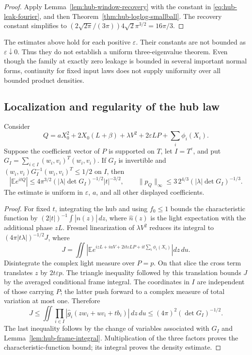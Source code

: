 \begin{proof}
Apply Lemma~\ref{lem:hub-window-recovery} with the constant in
\eqref{eq:hub-leak-fourier}, and then
Theorem~\ref{thm:hub-loglog-smallball}.
The recovery constant simplifies to
$(2\sqrt{2\pi}/(3\pi))4\sqrt2\pi^{3/2}=16\pi/3$.
\end{proof}

\begin{remark}\label{rem:hub-endpoint-open}
The estimates above hold for each positive $\varepsilon$.
Their constants are not bounded as $\varepsilon\downarrow0$.
Thus they do not establish a uniform three-eigenvalue theorem.
Even though the family at exactly zero leakage is bounded in several
important normal forms, continuity for fixed input laws does not supply
uniformity over all bounded product densities.
\end{remark}

\subsection{Localization and regularity of the hub law}

\begin{proposition}\label{prop:hub-localized}
Consider
\[
 Q=aX_0^2+2X_0(L+\beta)+\lambda V^2
                          +2\varepsilon LP+\sum_i\phi_i(X_i).
\]
Suppose the coefficient vector of $P$ is supported on $T$, let
$I=T^c$, and put
$G_I=\sum_{i\in I}(w_i,v_i)^T(w_i,v_i)$.
If $G_I$ is invertible and
$(w_i,v_i)G_I^{-1}(w_i,v_i)^T\le1/2$ on $I$, then
\[
 |\mathbb E e^{itQ}|\le
 4\pi^{3/2}(|\lambda|\det G_I)^{-1/2}|t|^{-3/2},
 \qquad
 \|p_Q\|_\infty\le
 3\,2^{4/3}(|\lambda|\det G_I)^{-1/3}.
\]
The estimate is uniform in $\varepsilon$, $a$, and all other displayed
coefficients.
\end{proposition}

\begin{proof}
For fixed $t$, integrating the hub and using $f_0\le1$ bounds the
characteristic function by $(2|t|)^{-1}\int|\widehat n(z)|\,dz$,
where $\widehat n(z)$ is the light expectation with the additional
phase $zL$.  Fresnel linearization of $\lambda V^2$ reduces its
integral to $(4\pi|t\lambda|)^{-1/2}J$, where
\[
 J=\iint\left|\mathbb E e^{izL+iuV+2it\varepsilon LP
                                     +it\sum_i\phi_i(X_i)}\right|dz\,du.
\]
Disintegrate the complex light measure over $P=p$.  On that slice the
cross term translates $z$ by $2t\varepsilon p$.  The triangle
inequality followed by this translation bounds $J$ by the averaged
conditional frame integral.  The coordinates in $I$ are independent
of those carrying $P$; the latter push forward to a complex measure of
total variation at most one.  Therefore
\[
 J\le\iint\prod_{i\in I}
        |\widehat g_i(zw_i+uv_i+tb_i)|\,dz\,du
 \le(4\pi)^2(\det G_I)^{-1/2}.
\]
The last inequality follows by the change of variables associated with
$G_I$ and Lemma~\ref{lem:hub-frame-integral}.
Multiplication of the three factors proves the characteristic-function
bound; its integral proves the density estimate.
\end{proof}

